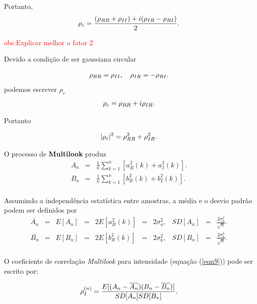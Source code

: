 \documentclass[12pt,a4paper]{article}
\begin{document}
Portanto, 
\begin{equation}\label{eqn16}
	\rho_c=\frac{(\rho_{RR}+\rho_{II})+i(\rho_{IR}-\rho_{RI})}{2}. \\
\end{equation}

\textcolor{red}{obs:Explicar melhor o fator 2}

Devido a condição de ser gaussiana circular

\begin{equation}\label{eqn17}
	\rho_{RR}=\rho_{II},\quad \rho_{IR}=-\rho_{RI}. \\
\end{equation}
podemos escrever $\rho_c$
\begin{equation}\label{eqn18}
	\rho_c=\rho_{RR}+i\rho_{IR}. \\
\end{equation}

Portanto

\begin{equation}\label{eqn19}
	|\rho_c|^2=\rho_{RR}^2+\rho_{IR}^2. \\
\end{equation}

O processo de {\bf Multilook} produz
\begin{equation}\label{eqn20}
\begin{array}{ccc}
	A_n&=&\frac{1}{n}\sum_{k=1}^{n} [a_{R}^2(k)+a_{I}^2(k)]. \\
	B_n&=&\frac{1}{n}\sum_{k=1}^{n} [b_{R}^2(k)+b_{I}^2(k)]. \\
\end{array}
\end{equation}

Assumindo a independência estatística entre amostras, a média e o desvio padrão podem ser definidos por
\begin{equation}\label{eqn21}
\begin{array}{cccccccccccc}
	\overline{A_n}&=&E[A_n]&=&2E[a_{R}^2(k)]&=&2\sigma_a^2,&SD[A_n]&=&\frac{2\sigma_a^2}{\sqrt{n}}.\\
	\overline{B_n}&=&E[B_n]&=&2E[b_{R}^2(k)]&=&2\sigma_b^2,&SD[B_n]&=&\frac{2\sigma_b^2}{\sqrt{n}}.\\
\end{array}
\end{equation}

O coeficiente de correlação {\it Multilook} para intensidade (equação (\ref{eqn9})) pode ser escrito por:

\begin{equation}\label{eqn22}
	\rho_I^{(n)}=\frac{E[(A_n-\overline{A_n})(B_n-\overline{B_n})]}{SD[A_n]SD[B_n]}. \\
\end{equation}
\end{document}
